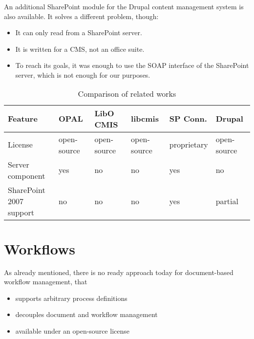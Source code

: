 An additional SharePoint module\cite{drupal-sp} for the Drupal content management system is also available. It solves a different problem, though:

\begin{itemize}
\item It can only read from a SharePoint server.
\item It is written for a CMS, not an office suite.
\item To reach its goals, it was enough to use the SOAP interface of the
SharePoint server, which is not enough for our purposes.
\end{itemize}

\begin{table}[H]
  \begin{center}
    \begin{tabular}{| l | l | l | l | l | l |}
    \hline
    \textbf{Feature} & \textbf{OPAL} & \textbf{LibO CMIS} & \textbf{libcmis} & \textbf{SP Conn.} & \textbf{Drupal} \\ \hline
    License          & open-source   & open-source        & open-source      & proprietary                   & open-source \\ \hline
    Server component & yes           & no                 & no               & yes                           & no \\ \hline
    \makecell[l]{SharePoint 2007 \\ support} & no & no    & no               & yes                           & partial \\ \hline
    \end{tabular}
  \end{center}
  \caption{Comparison of related works}
  \label{tab:related-cmp}
\end{table}

\section{Workflows}

As already mentioned, there is no ready approach today for document-based workflow management, that

\begin{itemize}
\item supports arbitrary process definitions
\item decouples document and workflow management
\item available under an open-source license
\end{itemize}

